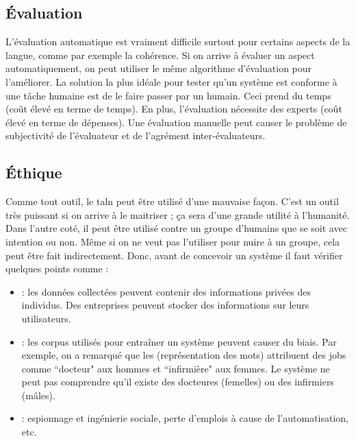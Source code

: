 \documentclass{KodeBook}
\begin{document}
\subsection{Évaluation}

L'évaluation automatique est vraiment difficile surtout pour certains aspects de la langue, comme par exemple la cohérence. 
Si on arrive à évaluer un aspect automatiquement, on peut utiliser le même algorithme d'évaluation pour l'améliorer. 
La solution la plus idéale pour tester qu'un système est conforme à une tâche humaine est de le faire passer par un humain.
Ceci prend du temps (coût élevé en terme de temps). 
En plus, l'évaluation nécessite des experts (coût élevé en terme de dépenses).
Une évaluation manuelle peut causer le problème de subjectivité de l'évaluateur et de l'agrément inter-évaluateurs.

\subsection{Éthique}

Comme tout outil, le \ac{taln} peut être utilisé d'une mauvaise façon. 
C'est un outil très puissant si on arrive à le maitriser ; ça sera d'une grande utilité à l'humanité. 
Dans l'autre coté, il peut être utilisé contre un groupe d'humains que se soit avec intention ou non. 
Même si on ne veut pas l'utiliser pour nuire à un groupe, cela peut être fait indirectement. 
Donc, avant de concevoir un système il faut vérifier quelques points comme :
\begin{itemize}
	\item {} : les données collectées peuvent contenir des informations privées des individus. Des entreprises peuvent stocker des informations sur leurs utilisateurs. 
	\item {} : les corpus utilisés pour entraîner un système peuvent causer du biais.
	Par exemple, on a remarqué que les  (représentation des mots) attribuent des jobs comme ``docteur" aux hommes et ``infirmière" aux femmes. 
	Le système ne peut pas comprendre qu'il existe des docteures (femelles) ou des infirmiers (mâles).
	\item {} : espionnage et ingénierie sociale, perte d'emplois à cause de l'automatisation, etc.
\end{itemize}
\end{document}
